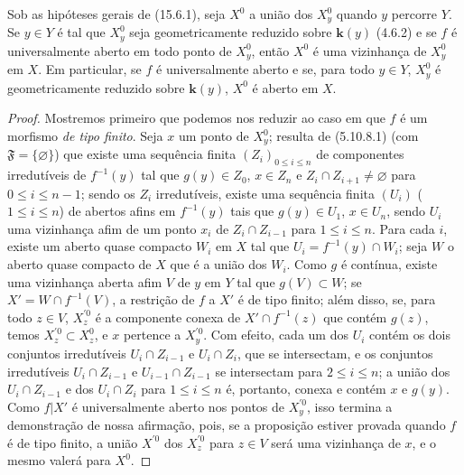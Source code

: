 \begin{proposition}[15.6.4]
\label{IV.15.6.4}
Sob as hipóteses gerais de (15.6.1), seja $X^0$ a união dos $X_y^0$ quando $y$ percorre $Y$. Se $y\in Y$ é tal que $X_y^0$ seja geometricamente reduzido sobre $\mathbf{k}(y)$ (4.6.2) e se $f$ é universalmente aberto em todo ponto de $X_y^0$, então $X^0$ é uma vizinhança de $X_y^0$ em $X$. Em particular, se $f$ é universalmente aberto e se, para todo $y\in Y$, $X_y^0$ é geometricamente reduzido sobre $\mathbf{k}(y)$, $X^0$ é aberto em $X$.
\end{proposition}

\begin{proof}
Mostremos primeiro que podemos nos reduzir ao caso em que $f$ é um morfismo \emph{de tipo finito}. Seja $x$ um ponto de $X_y^0$; resulta de (5.10.8.1) (com $\mathfrak F=\{\varnothing\}$) que existe uma sequência finita $(Z_i)_{0\leqslant i\leqslant n}$ de componentes irredutíveis de $f^{-1}(y)$ tal que $g(y)\in Z_0$, $x\in Z_n$ e $Z_i\cap Z_{i+1}\ne\varnothing$ para $0\leqslant i\leqslant n-1$; sendo os $Z_i$ irredutíveis, existe uma sequência finita $(U_i)$ ($1\leqslant i\leqslant n$) de abertos afins em $f^{-1}(y)$ tais que $g(y)\in U_1$, $x\in U_n$, sendo $U_i$ uma vizinhança afim de um ponto $x_i$ de $Z_i\cap Z_{i-1}$ para $1\leqslant i\leqslant n$. Para cada $i$, existe um aberto quase compacto $W_i$ em $X$ tal que $U_i=f^{-1}(y)\cap W_i$; seja $W$ o aberto quase compacto de $X$ que é a união dos $W_i$. Como $g$ é contínua, existe uma vizinhança aberta afim $V$ de $y$ em $Y$ tal que $g(V)\subset W$; se $X'=W\cap f^{-1}(V)$, a restrição de $f$ a $X'$ é de tipo finito; além disso, se, para todo $z\in V$, $X_z^{\prime 0}$ é a componente conexa de $X'\cap f^{-1}(z)$ que contém $g(z)$, temos $X_z^{\prime 0}\subset X_z^0$, e $x$ pertence a $X_y^{\prime 0}$. Com efeito, cada um dos $U_i$ contém os dois conjuntos irredutíveis $U_i\cap Z_{i-1}$ e $U_i\cap Z_i$, que se intersectam, e os conjuntos irredutíveis $U_i\cap Z_{i-1}$ e $U_{i-1}\cap Z_{i-1}$
se intersectam para $2\leqslant i\leqslant n$; a união dos $U_i\cap Z_{i-1}$ e dos $U_i\cap Z_i$ para $1\leqslant i\leqslant n$ é, portanto, conexa e contém $x$ e $g(y)$. Como $f|X'$ é universalmente aberto nos pontos de $X_y^{\prime 0}$, isso termina a demonstração de nossa afirmação, pois, se a proposição estiver provada quando $f$ é de tipo finito, a união $X^{\prime 0}$ dos $X_z^{\prime 0}$ para $z\in V$ será uma vizinhança de $x$, e o mesmo valerá para $X^0$.


\end{proof}
